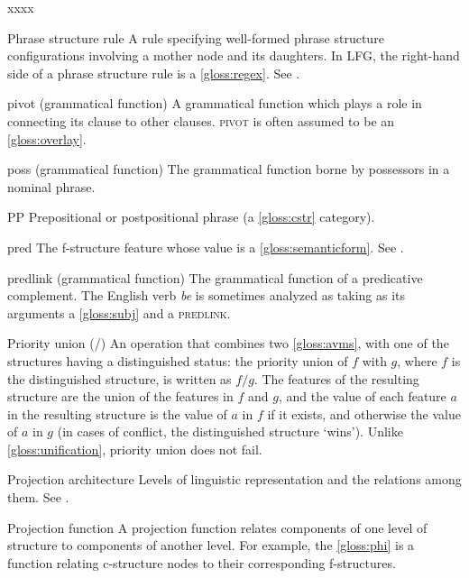 \documentclass[output=paper,colorlinks,citecolor=brown]{langscibook}
\begin{document}
\begin{labeling}{xxxx}
\item[Phrase structure rule\namedlabel{gloss:psr}{phrase structure rule}\namedlabel{gloss:psrs}{phrase structure rules}] A rule specifying well-formed phrase structure configurations involving a mother node and its daughters.  In LFG, the right-hand side of a phrase structure rule is a \ref{gloss:regex}.  See \citetv[\ref{sect:intro:c-structure}]{chapters/Intro}.

\item[pivot] (grammatical function) A grammatical function which plays a role in connecting its clause to other clauses.  \textsc{pivot} is often assumed to be an \ref{gloss:overlay}.

\item[poss] (grammatical function) The grammatical function borne by possessors in a nominal phrase.

\item[PP\namedlabel{gloss:PP}{PP}] Prepositional or postpositional phrase (a \ref{gloss:cstr} category).

\item[pred\namedlabel{gloss:PRED}{\textsc{pred}}] The f-structure feature whose value is a \ref{gloss:semanticform}. See \citetv[\ref{sect:pred}]{chapters/CoreConcepts}.

\item[predlink] (grammatical function) The grammatical function of a predicative complement.  The English verb \emph{be} is sometimes analyzed as taking as its arguments a \ref{gloss:subj} and a \textsc{predlink}.

\item[Priority union (/)] An operation that combines two \ref{gloss:avms}, with one of the structures having a distinguished status: the priority union of $f$ with $g$, where $f$ is the distinguished structure, is written as $f/g$.  The features of the resulting structure are the union of the features in $f$ and $g$, and the value of each feature $a$ in the resulting structure is the value of $a$ in $f$ if it exists, and otherwise the value of $a$ in $g$ (in cases of conflict, the distinguished structure `wins').  Unlike \ref{gloss:unification}, priority union does not fail.

\item[Projection architecture] Levels of linguistic representation and the relations among them.  See \citetv[\ref{sect:intro:addlevels}]{chapters/Intro}.

\item[Projection\namedlabel{gloss:projection}{projection} function] A projection function relates components of one level of structure to components of another level.  For example, the \ref{gloss:phi} is a function relating c-structure nodes to their corresponding f-structures.


\end{labeling}
\end{document}
